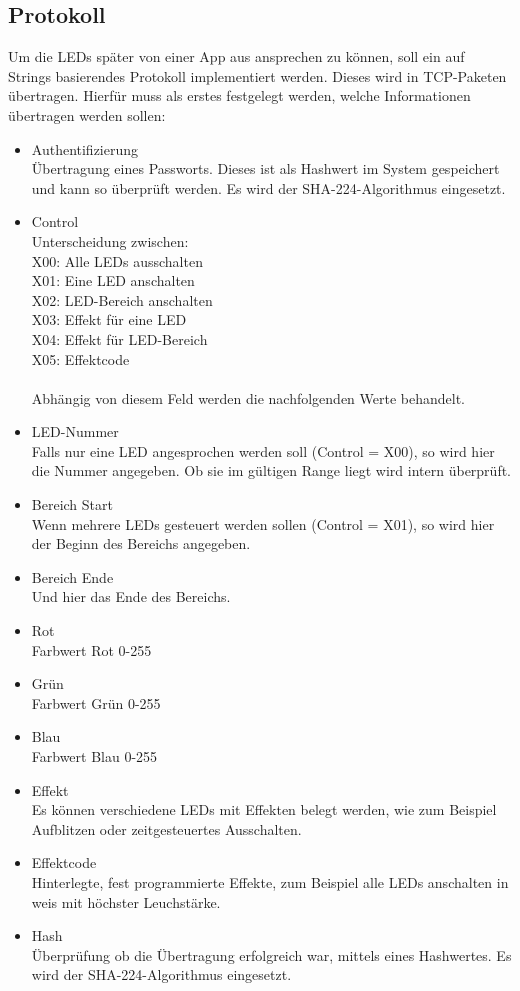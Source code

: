 
\subsection{Protokoll}
Um die LEDs später von einer App aus ansprechen zu können, soll ein auf Strings basierendes Protokoll implementiert werden. Dieses wird in TCP-Paketen übertragen. Hierfür muss als erstes festgelegt werden, welche Informationen übertragen werden sollen: \\
\begin{itemize}
\item Authentifizierung\\
Übertragung eines Passworts. Dieses ist als Hashwert im System gespeichert und kann so überprüft werden. Es wird der SHA-224-Algorithmus eingesetzt.
\item Control\\
Unterscheidung zwischen:\\
	X00: Alle LEDs ausschalten\\
	X01: Eine LED anschalten\\
	X02: LED-Bereich anschalten\\
	X03: Effekt für eine LED\\
	X04: Effekt für LED-Bereich\\
	X05: Effektcode \\\\
Abhängig von diesem Feld werden die nachfolgenden Werte behandelt. 
\item LED-Nummer\\
Falls nur eine LED angesprochen werden soll (Control = X00), so wird hier die Nummer angegeben. Ob sie im gültigen Range liegt wird intern überprüft.
\item Bereich Start\\
Wenn mehrere LEDs gesteuert werden sollen (Control = X01), so wird hier der Beginn des Bereichs angegeben.
\item Bereich Ende\\
Und hier das Ende des Bereichs. 
\item Rot\\
Farbwert Rot 0-255
\item Grün\\
Farbwert Grün 0-255
\item Blau\\
Farbwert Blau 0-255
\item Effekt\\
Es können verschiedene LEDs mit Effekten belegt werden, wie zum Beispiel Aufblitzen oder zeitgesteuertes Ausschalten.
\item Effektcode\\
Hinterlegte, fest programmierte Effekte, zum Beispiel alle LEDs anschalten in weis mit höchster Leuchstärke.
\item Hash\\
Überprüfung ob die Übertragung erfolgreich war, mittels eines Hashwertes. Es wird der SHA-224-Algorithmus eingesetzt.
\end{itemize}
